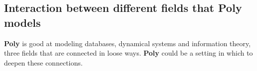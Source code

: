 \subsection{Interaction between different fields that Poly models}

\textbf{Poly} is good at modeling databases, dynamical systems and information theory, three fields that are connected in loose ways. \textbf{Poly} could be a setting in which to deepen these connections.


